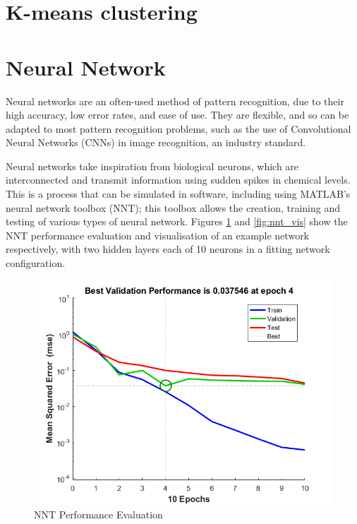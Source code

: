 \documentclass[a4paper, 10pt, conference]{ieeeconf}
\begin{document}
\section{K-means clustering}

\section{Neural Network}


Neural networks are an often-used method of pattern recognition, due to their high accuracy, low error rates, and ease of use. They are flexible, and so can be adapted to most pattern recognition problems, such as the use of Convolutional Neural Networks (CNNs) in image recognition, an industry standard.

Neural networks take inspiration from biological neurons, which are interconnected and transmit information using sudden spikes in chemical levels. This is a process that can be simulated in software, including using MATLAB's neural network toolbox (NNT); this toolbox allows the creation, training and testing of various types of neural network. Figures \ref{fig:nnt_perf} and \ref{fig:nnt_vis} show the NNT performance evaluation and visualisation of an example network respectively, with two hidden layers each of 10 neurons in a fitting network configuration.

\begin{figure}[!ht]
    \centering
    \includegraphics[width=\linewidth]{pic/performance}
    \caption{NNT Performance Evaluation}
    \label{fig:nnt_perf}
\end{figure}
\end{document}
